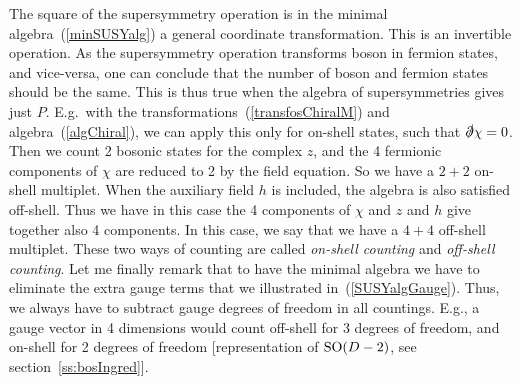 \documentclass[a4paper,11pt,twoside]{article}
\newcommand{\Red}[1]{#1}
\newcommand{\OliveGreen}[1]{#1}
\newcommand{\Blue}[1]{#1}
\newcommand{\SO}{\mathop{\rm SO}}
\begin{document}
The square of the supersymmetry operation is in the minimal
algebra~(\ref{minSUSYalg}) a general coordinate transformation. This is
an invertible operation. As the supersymmetry operation transforms boson
in fermion states, and vice-versa, one can conclude that the number of
boson and fermion states should be the same. This is thus true when the
algebra of supersymmetries gives just $\OliveGreen{P}$. E.g.\ with the
transformations~(\ref{transfosChiralM}) and algebra~(\ref{algChiral}), we
can apply this only for on-shell states, such that $\slashed\partial
\Blue{\chi }=0$. Then we count 2 bosonic states for the complex
$\Blue{z}$, and the 4 fermionic components of $\Blue{\chi }$ are reduced
to 2 by the field equation. So we have a $2+2$ on-shell multiplet. When
the auxiliary field $\Red{h}$ is included, the algebra is also satisfied
off-shell. Thus we have in this case the 4 components of $\Blue{\chi }$
and $\Blue{z}$ and $\Red{h}$ give together also 4 components. In this
case, we say that we have a $4+4$ off-shell multiplet. These two ways of
counting are called \emph{on-shell counting} and \emph{off-shell
counting}. Let me finally remark that to have the minimal algebra we have
to eliminate the extra gauge terms that we illustrated
in~(\ref{SUSYalgGauge}). Thus, we always have to subtract gauge degrees
of freedom in all countings. E.g., a gauge vector in 4 dimensions would
count off-shell for 3 degrees of freedom, and on-shell for 2 degrees of
freedom [representation of $\SO(D-2)$, see section~\ref{ss:bosIngred}].
\end{document}
